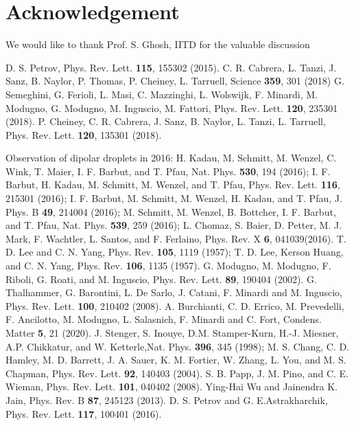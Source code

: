 \documentclass[amsmath,amssymb,lengthcheck,aps,prl] {revtex4}
\begin{document}

\section*{Acknowledgement} We would like to thank Prof. S. Ghosh, IITD for the valuable discussion

\begin{thebibliography}{50}

 D. S. Petrov, Phys. Rev. Lett. {\bf 115}, 155302 (2015).
 C. R. Cabrera, L. Tanzi, J. Sanz, B. Naylor, P. Thomas, P. Cheiney, L. Tarruell, Science {\bf 359}, 301 (2018)
 G. Semeghini, G. Ferioli, L. Masi, C. Mazzinghi, L. Wolswijk, F. Minardi, M. Modugno, G. Modugno, M. Inguscio, M. Fattori,  	Phys. Rev. Lett. {\bf 120}, 235301 (2018).
 P. Cheiney, C. R. Cabrera, J. Sanz, B. Naylor, L. Tanzi, L. Tarruell, Phys. Rev. Lett. {\bf 120}, 135301 (2018). 

 Observation of dipolar droplets in 2016: H. Kadau, M. Schmitt, M. Wenzel, C. Wink, T. Maier, I. F. Barbut, and T. Pfau, Nat. Phys. {\bf 530}, 194 (2016); 
I. F. Barbut, H. Kadau, M. Schmitt, M. Wenzel, and T. Pfau, Phys. Rev. Lett. {\bf 116}, 215301 (2016); I. F. Barbut, M. Schmitt, M. Wenzel, H. Kadau, and T. Pfau, J. Phys. B {\bf 49}, 214004 (2016);  M. Schmitt, M. Wenzel, B. Bottcher, I. F. Barbut, and T. Pfau, Nat. Phys. \textbf{539}, 259 (2016);  L. Chomaz, S. Baier, D. Petter, M. J. Mark, F. Wachtler, L.  Santos,  and  F.  Ferlaino,  Phys.  Rev.  X \textbf{6},  041039(2016).
 T. D. Lee and C. N. Yang, Phys. Rev. \textbf{105}, 1119 (1957); T. D. Lee, Kerson Huang, and C. N. Yang, Phys. Rev. \textbf{106}, 1135 (1957).
G. Modugno, M. Modugno, F. Riboli, G. Roati, and M. Inguscio, Phys. Rev. Lett. \textbf{89}, 190404 (2002).
 G. Thalhammer, G. Barontini, L. De Sarlo, J. Catani, F. Minardi and M. Inguscio, Phys. Rev. Lett. \textbf{100}, 210402 (2008).
 A. Burchianti, C. D. Errico, M. Prevedelli, F. Ancilotto, M. Modugno, L. Salasnich, F. Minardi and C. Fort, Condens. Matter {\bf 5}, 21 (2020).
 J. Stenger, S. Inouye, D.M. Stamper-Kurn, H.-J. Miesner, A.P. Chikkatur, and W. Ketterle,Nat. Phys. \textbf{396}, 345 (1998); M. S. Chang, C. D. Hamley, M. D. Barrett, J. A. Sauer, K. M. Fortier, W. Zhang, L. You, and M. S. Chapman, Phys. Rev. Lett. \textbf{92}, 140403 (2004).
 S. B. Papp, J. M. Pino, and C. E. Wieman, Phys. Rev. Lett. \textbf{101}, 040402 (2008).
 Ying-Hai Wu and Jainendra K. Jain, Phys. Rev. B \textbf{87}, 245123 (2013).
 D. S. Petrov and G. E.Astrakharchik, Phys. Rev. Lett. \textbf{117}, 100401 (2016).


\end{thebibliography}
\end{document}
